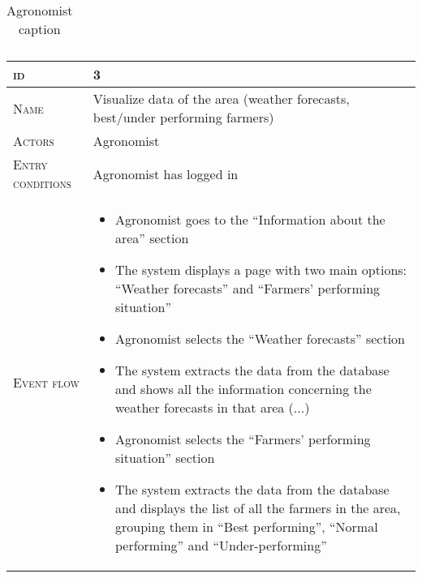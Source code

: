 \begin{table}[H]
\begin{tabular}[c]{|l|p{}|}
    \end{tabular}
    \caption{\label{tab:help_request_section_access}Agronomist caption }
\end{table}



\begin{table}[H]
    \centering
    \begin{tabular}[c]{|l|p{}|}
        \hline %
    	\textsc{id}                 &   3\\
    	\hline %
    	\textsc{Name}               &   Visualize data of the area (weather forecasts, best/under performing farmers)\\
    	\hline %
    	\textsc{Actors}             &   Agronomist\\
    	\hline %
    	\textsc{Entry conditions}   &   Agronomist has logged in\\
    	\hline %
    	\textsc{Event flow}         &   \footnotesize
            	                        \begin{itemize}
                                    	    \item Agronomist goes to the “Information about the area” section
                                    		\item The system displays a page with two main options: “Weather forecasts” and “Farmers’ performing situation”
                                    		\item Agronomist selects  the “Weather forecasts” section
                                    		\item The system extracts the data from the database and shows all the information concerning the weather forecasts in that area (...)
                                    		\item Agronomist selects the “Farmers’ performing situation” section
                                    		\item The system extracts the data from the database and displays the list of all the farmers in the area, grouping them in “Best performing”, “Normal performing” and “Under-performing”
                                        \end{itemize}\\

\end{tabular}
\end{table}
